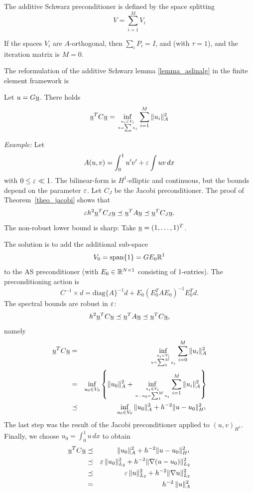 \bigskip

The additive Schwarz preconditioner is defined by the space splitting
$$
V = \sum_{i=1}^M V_i
$$

\bigskip

If the spaces $V_i$ are $A$-orthogonal, then $\sum_i P_i = I$, and (with 
$\tau = 1$), and the iteration matrix is $M = 0$.

\bigskip

The reformulation of the additive Schwarz lemma \ref{lemma_aslinalg} in the
finite element framework is
\begin{lemma} Let $u = G \underline u$. There holds
$$
\underline u^T C \underline u = \inf_{u_i \in V_i \atop u = \sum u_i} \sum_{i=1}^M  \| u_i \|_A^2
$$
\end{lemma}

\bigskip

{\em Example:} Let 
$$
A(u,v) = \int_0^1 u^\prime v^\prime + \varepsilon \int u v \, dx
$$ 
with $0 \leq \varepsilon \ll 1$. 
The bilinear-form is $H^1$-elliptic and continuous, but the bounds depend
on the parameter $\varepsilon$. Let $C_J$ be the Jacobi preconditioner. The proof
of Theorem~\ref{theo_jacobi} shows that
$$
\varepsilon h^2 \underline u^T C_J \underline u \preceq \underline u^T A \underline u \preceq \underline u^T C_J \underline u.
$$
The non-robust lower bound is sharp: Take $\underline u = (1,\ldots,1)^T$. 

The solution is to add the additional sub-space 
$$
V_0 = \mbox{span} \{ 1 \} = G E_0 {\mathbb R}^1
$$
to the AS preconditioner (with $E_0 \in {\mathbb R}^{N\times1}$ consisting of 1-entries). The preconditioning action is
$$
C^{-1} \times d = \mbox{diag} \{ A \}^{-1} d + E_0 (E_0^T A E_0)^{-1} E_0^T d.
$$
The spectral bounds are robust in $\varepsilon$:
$$
h^2 \underline u^T C \underline u \preceq \underline u^T A \underline u \preceq \underline u^T C \underline u,
$$
namely
\begin{eqnarray*}
\underline u^T C \underline u & = & 
\inf_{u_i \in V_i \atop u = \sum_0^M u_i} \sum_{i=0}^M  \| u_i \|_A^2 \\
& = & 
\inf_{u_0 \in V_0} 
\left\{ 
\| u_0 \|_A^2 + \inf_{u_i \in V_i \atop u-u_0 = \sum_1^M u_i} \sum_{i=1}^M \| u_i \|_A^2 \right\} \\ 
& \preceq & \inf_{u_0 \in V_0} 
\| u_0 \|_A^2 + h^{-2} \| u - u_0 \|_{H^1}^2
\end{eqnarray*}
The last step was the result of the Jacobi preconditioner applied to $(u,v)_{H^1}$. Finally, we choose $u_0 = \int_0^1 u \, dx$ to obtain
\begin{eqnarray*}
\underline u^T C \underline u & \preceq & \| u_0 \|_A^2 + h^{-2} \| u - u_0 \|_{H^1}^2 \\
        & \preceq & \varepsilon \, \| u_0 \|_{L_2}^2 + h^{-2} \| \nabla (u-u_0) \|_{L_2}^2 \\
        & \preceq & \varepsilon \, \| u \|_{L_2}^2 + h^{-2} \| \nabla u \|_{L_2}^2 \\
        & = & h^{-2} \, \| u \|_A^2
\end{eqnarray*}


